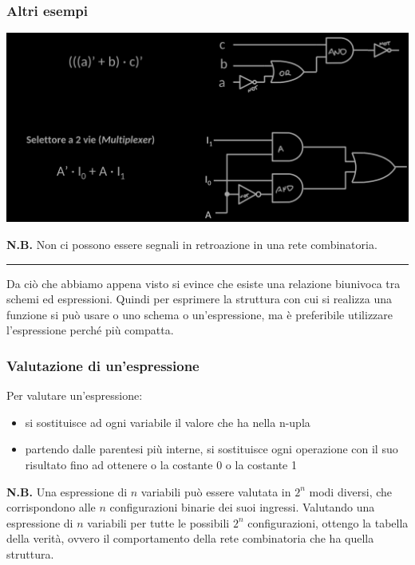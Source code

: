 \documentclass{article}
\begin{document}
\subsubsection*{Altri esempi}
\begin{center}
    \includegraphics[scale=0.3]{esp2}
\end{center}
\textbf{N.B.} Non ci possono essere segnali in retroazione in una rete combinatoria.
\par\noindent\rule{\textwidth}{0.4pt}
Da ciò che abbiamo appena visto si evince che esiste una relazione biunivoca tra schemi ed espressioni. Quindi per esprimere la struttura con cui si realizza una funzione si può usare o uno schema o un'espressione, ma è preferibile utilizzare l'espressione perché più compatta. 
\subsubsection{Valutazione di un'espressione}
Per valutare un'espressione:
\begin{itemize}
    \item si sostituisce ad ogni variabile il valore che ha nella n-upla
    \item partendo dalle parentesi più interne, si sostituisce ogni operazione con il suo risultato fino ad ottenere o la costante 0 o la costante 1
\end{itemize}
\textbf{N.B.} Una espressione di $n$ variabili può essere valutata in $2^n$ modi diversi, che corrispondono alle $n$ configurazioni binarie dei suoi ingressi. Valutando una espressione di $n$ variabili per tutte le possibili $2^n$ configurazioni, ottengo la tabella della verità, ovvero il comportamento della rete combinatoria che ha quella struttura.
\end{document}
